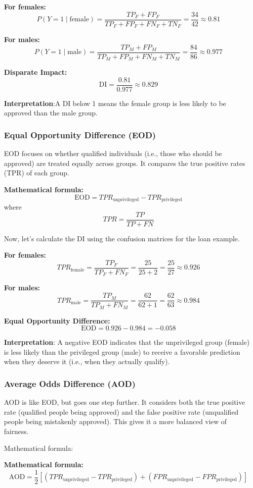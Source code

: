 \par \textbf{For females:}
$$
P(Y = 1 \mid \text{female}) = \frac{TP_F + FP_F}{TP_F + FP_F + FN_F + TN_F} = \frac{34}{42} \approx 0.81
$$

\textbf{For males:}
$$
P(Y = 1 \mid \text{male}) = \frac{TP_M + FP_M}{TP_M + FP_M + FN_M + TN_M} = \frac{84}{86} \approx 0.977
$$

\textbf{Disparate Impact:}
$$
\text{DI} = \frac{0.81}{0.977} \approx 0.829
$$

\par \textbf{Interpretation}:A DI below 1 means the female group is less likely to be approved than the male group. 


\subsubsection{Equal Opportunity Diﬀerence (EOD)}
EOD focuses on whether qualified individuals (i.e., those who should be approved) are treated equally across groups. It compares the true positive rates (TPR) of each group.
\par \textbf{Mathematical formula:}
$$
\text{EOD} = TPR_{\text{unprivileged}} - TPR_{\text{privileged}}
$$
where
$$
TPR = \frac{TP}{TP + FN}
$$

\par Now, let's calculate the DI using the confusion matrices for the loan example.

\textbf{For females:}
$$
TPR_{\text{female}} = \frac{TP_F}{TP_F + FN_F} = \frac{25}{25 + 2} = \frac{25}{27} \approx 0.926
$$

\textbf{For males:}
$$
TPR_{\text{male}} = \frac{TP_M}{TP_M + FN_M} = \frac{62}{62 + 1} = \frac{62}{63} \approx 0.984
$$

\textbf{Equal Opportunity Difference:}
$$
\text{EOD} = 0.926 - 0.984 = -0.058
$$

\par \textbf{Interpretation}: A negative EOD indicates that the unprivileged group (female) is less likely than the privileged group (male) to receive a favorable prediction when they deserve it (i.e., when they actually qualify).


\subsubsection{Average Odds Diﬀerence (AOD)}
AOD is like EOD, but goes one step further. It considers both the true positive rate (qualified people being approved) and the false positive rate (unqualified people being mistakenly approved). This gives it a more balanced view of fairness.  
\par Mathematical formula: 
\par \textbf{Mathematical formula:}
$$
\text{AOD} = \frac{1}{2} \left[ \left( TPR_{\text{unprivileged}} - TPR_{\text{privileged}} \right) + \left( FPR_{\text{unprivileged}} - FPR_{\text{privileged}} \right) \right]
$$

